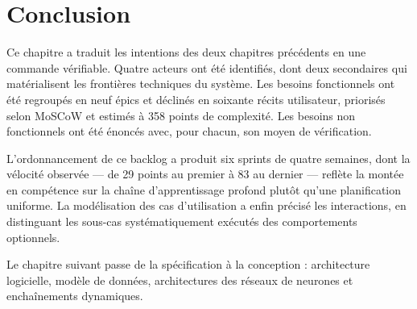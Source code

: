 \section{Conclusion}

Ce chapitre a traduit les intentions des deux chapitres précédents en une commande
vérifiable. Quatre acteurs ont été identifiés, dont deux secondaires qui matérialisent
les frontières techniques du système. Les besoins fonctionnels ont été regroupés en
neuf épics et déclinés en soixante récits utilisateur, priorisés selon MoSCoW et
estimés à 358 points de complexité. Les besoins non fonctionnels ont été énoncés avec,
pour chacun, son moyen de vérification.

L'ordonnancement de ce backlog a produit six sprints de quatre semaines, dont la
vélocité observée — de 29 points au premier à 83 au dernier — reflète la montée en
compétence sur la chaîne d'apprentissage profond plutôt qu'une planification
uniforme. La modélisation des cas d'utilisation a enfin précisé les interactions, en
distinguant les sous-cas systématiquement exécutés des comportements optionnels.

Le chapitre suivant passe de la spécification à la conception : architecture logicielle,
modèle de données, architectures des réseaux de neurones et enchaînements dynamiques.
